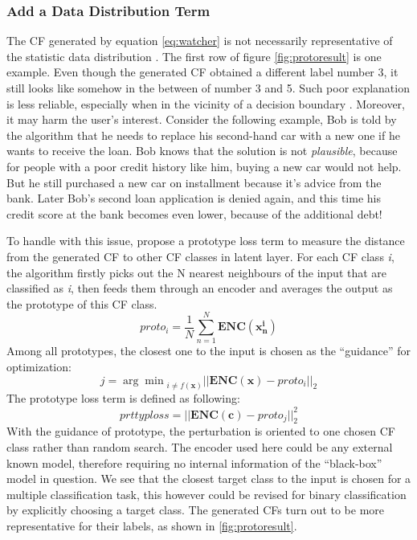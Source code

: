 \subsubsection{Add a Data Distribution Term}
The CF generated by equation \ref{eq:watcher} is not necessarily representative of the statistic data distribution \cite{FACE}. The first row of figure \ref{fig:protoresult} is one example. Even though the generated CF obtained a different label number 3, it still looks like somehow in the between of number 3 and 5. Such poor explanation is less reliable, especially when in the vicinity of a decision boundary \cite{FACE}. Moreover, it may harm the user's interest. Consider the following example, Bob is told by the algorithm that he needs to replace his second-hand car with a new one if he wants to receive the loan. Bob knows that the solution is not \emph{plausible}, because for people with a poor credit history like him, buying a new car would not help. But he still purchased a new car on installment because it's advice from the bank. Later Bob's second loan application is denied again, and this time his credit score at the bank becomes even lower, because of the additional debt!

To handle with this issue, \citeauthor{prototype} \cite{prototype} propose a prototype loss term to measure the distance from the generated CF to other CF classes in latent layer. For each CF class \emph{i}, the algorithm firstly picks out the N nearest neighbours of the input that are classified as \emph{i}, then feeds them through an encoder and averages the output as the prototype of this CF class.
\begin{equation}\label{eq:prototype}
  proto_i=\frac{1}{N}\sum_{n=1}^{N}\mathbf{ENC}(\mathbf{x_n^i})
\end{equation}
Among all prototypes, the closest one to the input is chosen as the ``guidance'' for optimization:
\begin{equation}\label{eq:closestProto}
  j = {\arg\min}_{i\neq f(\textbf{x})}||\mathbf{ENC}(\textbf{x})-proto_i||_2
\end{equation}
The prototype loss term is defined as following:
\begin{equation}\label{eq:protoloss}
  prttyploss=||\mathbf{ENC}(\textbf{c})-proto_j||_2^2
\end{equation}
With the guidance of prototype, the perturbation is oriented to one chosen CF class rather than random search. The encoder used here could be any external known model, therefore requiring no internal information of the ``black-box'' model in question. We see that the closest target class to the input is chosen for a multiple classification task, this however could be revised for binary classification by explicitly choosing a target class. The generated CFs turn out to be more representative for their labels, as shown in \autoref{fig:protoresult}.


